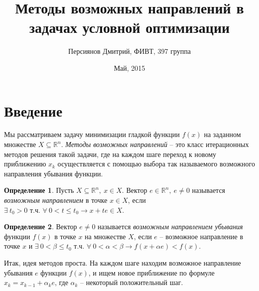 \documentclass{article}
\theoremstyle{plain}
\theoremstyle{definition}
\newtheorem{defn}{Определение}[section]
\begin{document}
\pagestyle{empty}

\title{Методы возможных направлений в задачах условной оптимизации}
\author{Персиянов Дмитрий, ФИВТ, 397 группа}
\date{Май, 2015}
\maketitle

\tableofcontents

\cleardoublepage
\pagestyle{headings}

\section{Введение}

Мы рассматриваем задачу минимизации гладкой функции $f(x)$ на заданном множестве $X \subseteq \mathbb{R}^n$.
\textit{Методы возможных направлений} -- это класс итерационных методов решения такой задачи, где на каждом шаге переход к новому приближению $x_k$ осуществляется с помощью выбора так называемого возможного направления убывания функции.

\begin{defn}
Пусть $X \subseteq \mathbb{R}^n,~x\in X$. Вектор $e \in \mathbb{R}^n,~ e \neq 0$ называется \textit{возможным направлением} в точке $x \in X$, если $\exists ~t_0 > 0 \text{ т.ч. } \forall ~0<t\leqslant t_0 \rightarrow x+te \in X$.
\end{defn}

\begin{defn}
Вектор $e \neq 0$ называется \textit{возможным направлением убывания} функции $f(x)$ в точке $x$ на множестве $X$, если $e$ -- возможное направление в точке $x$ и $\exists~0 < \beta \leqslant t_0 \text{ т.ч. } \forall ~0 < \alpha < \beta \rightarrow f(x+\alpha e) < f(x)$.
\end{defn}

Итак, идея методов проста. На каждом шаге находим возможное направление убывания $e$ функции $f(x)$, и ищем новое приближение по формуле $x_k = x_{k-1} + \alpha_k e$, где $\alpha_k$ -- некоторый положительный шаг.
\end{document}
